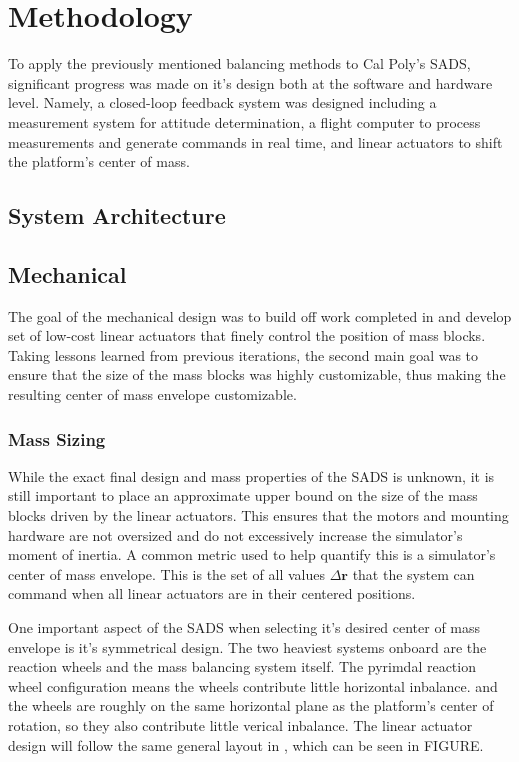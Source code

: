 \chapter{Methodology}

To apply the previously mentioned balancing methods to Cal Poly's SADS, significant progress was made on it's design both at the software and hardware level. Namely, a closed-loop feedback system was designed including a measurement system for attitude determination, a flight computer to process measurements and generate commands in real time, and linear actuators to shift the platform's center of mass.

\section{System Architecture}

\section{Mechanical}

The goal of the mechanical design was to build off work completed in \cite{gilman_automatic_2024} and develop set of low-cost linear actuators that finely control the position of mass blocks. Taking lessons learned from previous iterations, the second main goal was to ensure that the size of the mass blocks was highly customizable, thus making the resulting center of mass envelope customizable. 

\subsection{Mass Sizing}

While the exact final design and mass properties of the SADS is unknown, it is still important to place an approximate upper bound on the size of the mass blocks driven by the linear actuators. This ensures that the motors and mounting hardware are not oversized and do not excessively increase the simulator's moment of inertia. A common metric used to help quantify this is a simulator's center of mass envelope. This is the set of all values $\Delta\mathbf{r}$ that the system can command when all linear actuators are in their centered positions.

One important aspect of the SADS when selecting it's desired center of mass envelope is it's symmetrical design. The two heaviest systems onboard are the reaction wheels and the mass balancing system itself. The pyrimdal reaction wheel configuration means the wheels contribute little horizontal inbalance. and the wheels are roughly on the same horizontal plane as the platform's center of rotation, so they also contribute little verical inbalance. The linear actuator design will follow the same general layout in \cite{gilman_automatic_2024}, which can be seen in FIGURE. 

